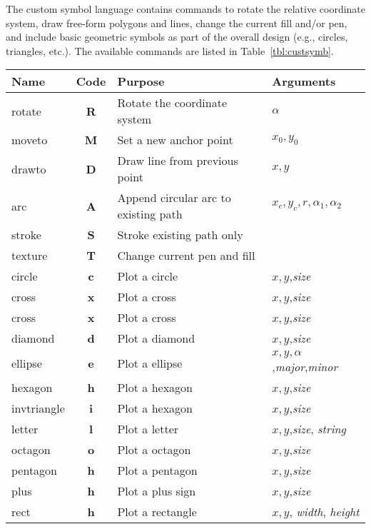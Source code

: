 The custom symbol language contains commands to rotate the relative coordinate system,
draw free-form polygons and lines, change the current fill and/or pen, and include basic
geometric symbols as part of the overall design (e.g., circles, triangles, etc.).
The available commands are listed in
Table~\ref{tbl:custsymb}.
\begin{table}[H]
\small
\centering
\begin{tabular}{|l|c|l|l|} \hline
Name 		& 	Code		&	Purpose				&	Arguments \\ \hline
rotate		&	\textbf{R}	& Rotate the coordinate system		& $\alpha$ \\ \hline
moveto		&	\textbf{M}	& Set a new anchor point 		& $x_0, y_0$  \\ \hline
drawto		&	\textbf{D}	& Draw line from previous point 	& $x, y$  \\ \hline
arc		&	\textbf{A}	& Append circular arc to existing path 	& $x_c, y_c, r, \alpha_1, \alpha_2$  \\ \hline
stroke		&	\textbf{S}	& Stroke existing path only 		&  \\ \hline \hline
texture		&	\textbf{T}	& Change current pen and fill		&  \\ \hline \hline
circle		&	\textbf{c}	& Plot a circle 			& $x, y$,\emph{size}  \\ \hline
cross		&	\textbf{x}	& Plot a cross 				& $x, y$,\emph{size}  \\ \hline
cross		&	\textbf{x}	& Plot a cross 				& $x, y$,\emph{size}  \\ \hline
diamond		&	\textbf{d}	& Plot a diamond 			& $x, y$,\emph{size}  \\ \hline
ellipse		&	\textbf{e}	& Plot a ellipse 			& $x, y, \alpha$,\emph{major},\emph{minor}  \\ \hline
hexagon		&	\textbf{h}	& Plot a hexagon 			& $x, y$,\emph{size}  \\ \hline
invtriangle	&	\textbf{i}	& Plot a hexagon 			& $x, y$,\emph{size}  \\ \hline
letter		&	\textbf{l}	& Plot a letter 			& $x, y$,\emph{size}, \emph{string}  \\ \hline
octagon		&	\textbf{o}	& Plot a octagon 			& $x, y$,\emph{size}  \\ \hline
pentagon	&	\textbf{h}	& Plot a pentagon 			& $x, y$,\emph{size}  \\ \hline
plus		&	\textbf{h}	& Plot a plus sign 			& $x, y$,\emph{size}  \\ \hline
rect		&	\textbf{h}	& Plot a rectangle 			& $x, y$, \emph{width}, \emph{height}  \\ \hline

\end{tabular}
\end{table}
